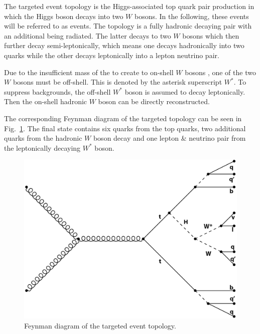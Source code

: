 \documentclass[bachelor,ngerman,english]{GAUBM}
\begin{document}
The targeted event topology is the Higgs-associated top quark pair production in which the Higgs boson decays into two $W$ bosons. In the following, these events will be referred to as \ttHWW events. The topology is a fully hadronic decaying \ttbar pair with an additional \Hboson being radiated. The latter decays to two $W$ bosons which then further decay semi-leptonically, which means one \wboson decays hadronically into two quarks while the other decays leptonically into a lepton neutrino pair.

Due to the insufficient mass of the \Hboson to create to on-shell $W$ bosons \cite{pdg}, one of the two $W$ bosons must be off-shell. This is denoted by the asterisk superscript $W^*$. To suppress backgrounds, the off-shell $W^*$ boson is assumed to decay leptonically. Then the on-shell hadronic $W$ boson can be directly reconstructed.

The corresponding Feynman diagram of the targeted topology can be seen in Fig.~\ref{fig:feynman_tthww}. The final state contains six quarks from the top quarks, two additional quarks from the hadronic $W$ boson decay and one lepton \& neutrino pair from the leptonically decaying $W^*$ boson.   

\begin{figure}[t]
    \centering
    \includegraphics[width=.61\textwidth]{figures/feynman/ttH_labeled.png}
    \caption{Feynman diagram of the targeted \ttHWW event topology.}
    \label{fig:feynman_tthww}
\end{figure}

\end{document}
